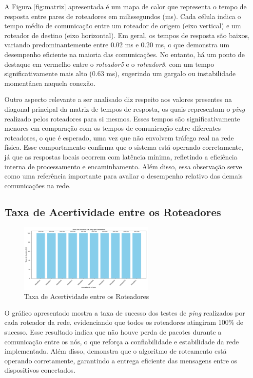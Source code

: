 \documentclass[12pt,a4paper]{report}
\begin{document}
A Figura \ref{fig:matriz} apresentada é um mapa de calor que representa o tempo de resposta entre pares de roteadores em milissegundos (ms). Cada célula indica o tempo médio de comunicação entre um roteador de origem (eixo vertical) e um roteador de destino (eixo horizontal). Em geral, os tempos de resposta são baixos, variando predominantemente entre 0.02 ms e 0.20 ms, o que demonstra um desempenho eficiente na maioria das comunicações. No entanto, há um ponto de destaque em vermelho entre o \textit{roteador5} e o \textit{roteador8}, com um tempo significativamente mais alto (0.63 ms), sugerindo um gargalo ou instabilidade momentânea naquela conexão.

Outro aspecto relevante a ser analisado diz respeito aos valores presentes na diagonal principal da matriz de tempos de resposta, os quais representam o \textit{ping} realizado pelos roteadores para si mesmos. Esses tempos são significativamente menores em comparação com os tempos de comunicação entre diferentes roteadores, o que é esperado, uma vez que não envolvem tráfego real na rede física. Esse comportamento confirma que o sistema está operando corretamente, já que as respostas locais ocorrem com latência mínima, refletindo a eficiência interna de processamento e encaminhamento. Além disso, essa observação serve como uma referência importante para avaliar o desempenho relativo das demais comunicações na rede.

\subsection{Taxa de Acertividade entre os Roteadores}
\begin{figure}[h!]
    \centering
    \includegraphics[width=0.6\textwidth]{grafico_taxa_sucesso.png}
    \caption{Taxa de Acertividade entre os Roteadores}
    \label{fig:barras}
\end{figure}

O gráfico apresentado mostra a taxa de sucesso dos testes de \textit{ping} realizados por cada roteador da rede, evidenciando que todos os roteadores atingiram 100\% de sucesso. Esse resultado indica que não houve perda de pacotes durante a comunicação entre os nós, o que reforça a confiabilidade e estabilidade da rede implementada. Além disso, demonstra que o algoritmo de roteamento está operando corretamente, garantindo a entrega eficiente das mensagens entre os dispositivos conectados.
\end{document}
